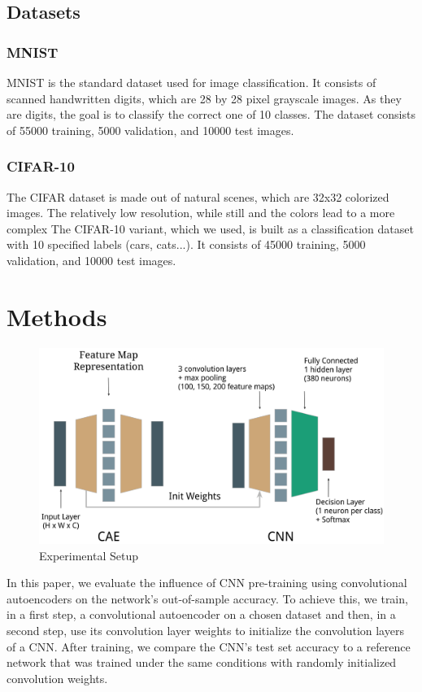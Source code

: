 \documentclass{article}
\begin{document}
\subsection{Datasets}
  \subsubsection{MNIST}
    MNIST \citep{lecun1998mnist} is the standard dataset used for image classification. It consists of scanned handwritten digits, which are 28 by 28 pixel grayscale images. As they are digits, the goal is to classify the correct one of 10 classes.
    The dataset consists of 55000 training, 5000 validation, and 10000 test images.
  \subsubsection{CIFAR-10}
    The CIFAR dataset \citep{krizhevsky2009learning} is made out of natural scenes, which are 32x32 colorized images. The relatively low resolution, while still and the colors lead to a more complex
    The CIFAR-10 variant, which we used, is built as a classification dataset with 10 specified labels (cars, cats...).
    It consists of 45000 training, 5000 validation, and 10000 test images.

\section{Methods}

  \begin{figure}[ht]
    \centering
    \includegraphics[width=0.6\linewidth]{../graphics/setup.png}
    \caption{Experimental Setup}
    \label{fig:experimental_setup}
  \end{figure}

  In this paper, we evaluate the influence of CNN pre-training using convolutional autoencoders on the network's out-of-sample accuracy. To achieve this, we train, in a first step, a convolutional autoencoder on a chosen dataset and then, in a second step, use its convolution layer weights to initialize the convolution layers of a CNN. After training, we compare the CNN's test set accuracy to a reference network that was trained under the same conditions with randomly initialized convolution weights. 
\end{document}
